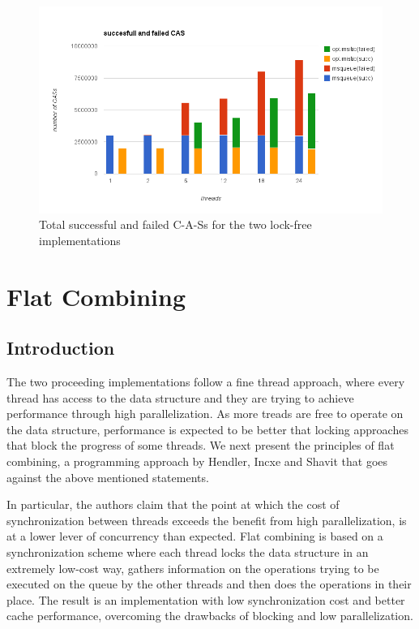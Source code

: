 \begin{figure}
 \centering
  \includegraphics[scale=0.5]{failed_cas.png}
\caption{Total successful and failed C-A-Ss for the two lock-free implementations}
\end{figure}

\section{Flat Combining}
\subsection{Introduction}

The two proceeding implementations follow a fine thread approach, where every thread has access to the data structure and they are trying to achieve performance through high parallelization. As more treads are free to operate on the data structure, performance is expected to be better that locking approaches that block the progress of some threads. We next present the principles of flat combining, a programming approach by Hendler, Incxe and Shavit \cite{flat_combining} that goes against the above mentioned statements.

In particular, the authors claim that the point at which the cost of synchronization between threads exceeds the benefit from high parallelization, is at a lower lever of concurrency than expected. Flat combining is based on a synchronization scheme where each thread locks  the data structure in an extremely low-cost way, gathers information on the operations trying to be executed on the queue by the other threads and then does the operations in their place. The result is an implementation with low synchronization cost and better cache performance, overcoming the drawbacks of blocking and low parallelization.

